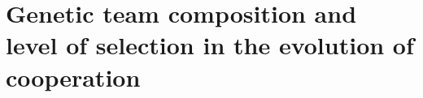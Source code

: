 \section{Genetic team composition and level of selection in the evolution of cooperation \cite{waibel2009genetic}}
